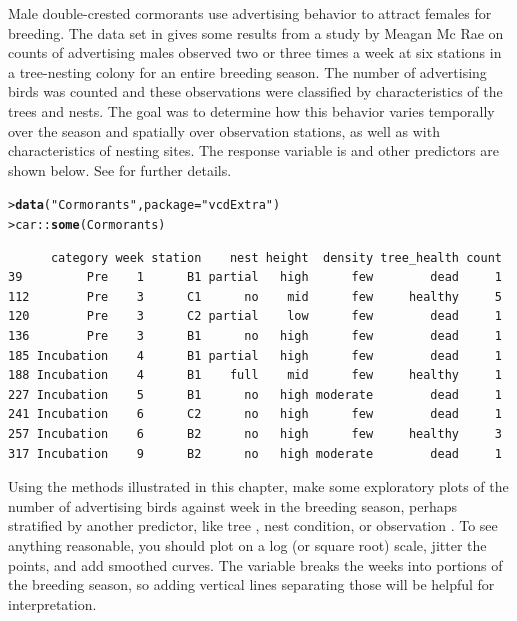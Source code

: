 \documentclass[10pt]{report}\usepackage[]{graphicx}\usepackage[]{color}
\makeatletter
\newcommand{\hlstr}[1]{\textcolor[rgb]{0.192,0.494,0.8}{#1}}%
\newcommand{\hlopt}[1]{\textcolor[rgb]{0,0,0}{#1}}%
\newcommand{\hlstd}[1]{\textcolor[rgb]{0.345,0.345,0.345}{#1}}%
\newcommand{\hlkwc}[1]{\textcolor[rgb]{0.333,0.667,0.333}{#1}}%
\newcommand{\hlkwd}[1]{\textcolor[rgb]{0.737,0.353,0.396}{\textbf{#1}}}%
\newenvironment{kframe}{%
 \def\at@end@of@kframe{}%
 \ifinner\ifhmode%
  \def\at@end@of@kframe{\end{minipage}}%
  \begin{minipage}{\columnwidth}%
 \fi\fi%
 \def\FrameCommand##1{\hskip\@totalleftmargin \hskip-\fboxsep
 \colorbox{shadecolor}{##1}\hskip-\fboxsep
     \hskip-\linewidth \hskip-\@totalleftmargin \hskip\columnwidth}%
 \MakeFramed {\advance\hsize-\width
   \@totalleftmargin\z@ \linewidth\hsize
   \@setminipage}}%
 {\par\unskip\endMakeFramed%
 \at@end@of@kframe}
\newenvironment{knitrout}{}{} %
\renewenvironment{knitrout}{\small\renewcommand{\baselinestretch}{.85}}{} %
\makeatother
\begin{document}
\begin{Exercises}
  \exercise Male double-crested cormorants use advertising behavior to attract females for breeding.
	The  data set in  gives some results from a study by
	Meagan Mc Rae \citeyearpar{McRae:2015} on counts of advertising males observed two or three times a week
	at six stations in a tree-nesting colony for an entire breeding season.
	The number of advertising birds was counted and these observations were classified
	by characteristics of the trees and nests. The goal was to determine how this behavior varies 
	temporally over the season and spatially over observation stations, as well as with 
	characteristics of nesting sites.
	The response variable is 
	and other predictors are shown below.  See 
	for further details.
\begin{knitrout}\footnotesize
{}\color{fgcolor}\begin{kframe}
\begin{alltt}
\hlstd{> }\hlkwd{data}\hlstd{(}\hlstr{"Cormorants"}\hlstd{,} \hlkwc{package} \hlstd{=} \hlstr{"vcdExtra"}\hlstd{)}
\hlstd{> }\hlstd{car}\hlopt{::}\hlkwd{some}\hlstd{(Cormorants)}
\end{alltt}
\begin{verbatim}
      category week station    nest height  density tree_health count
39         Pre    1      B1 partial   high      few        dead     1
112        Pre    3      C1      no    mid      few     healthy     5
120        Pre    3      C2 partial    low      few        dead     1
136        Pre    3      B1      no   high      few        dead     1
185 Incubation    4      B1 partial   high      few        dead     1
188 Incubation    4      B1    full    mid      few     healthy     1
227 Incubation    5      B1      no   high moderate        dead     1
241 Incubation    6      C2      no   high      few        dead     1
257 Incubation    6      B2      no   high      few     healthy     3
317 Incubation    9      B2      no   high moderate        dead     1
\end{verbatim}
\end{kframe}
\end{knitrout}
	\begin{enumerate*}
		\item Using the methods illustrated in this chapter, make some exploratory plots of the
		number of advertising birds against week in the breeding season, perhaps stratified
		by another predictor, like tree , nest condition, or observation
		. 
		To see anything reasonable,
		you should plot  on a log (or square root) scale, jitter the points, and add
		smoothed curves. The variable  breaks the weeks into portions of the
		breeding season, so adding vertical lines separating those will be helpful for interpretation.
		\begin{ans}
		\end{ans}
		

\end{enumerate*}
\end{Exercises}
\end{document}
